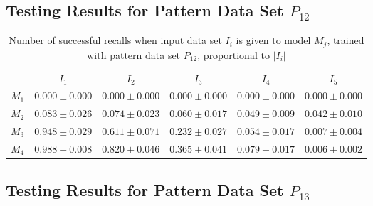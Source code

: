 \documentclass[anon]{CI}
\begin{document}
		\subsection{Testing Results for Pattern Data Set $P_{12}$}
		
		
		\begin{table}[H]
			\centering
			\def\arraystretch{1.5}
			\footnotesize
			\begin{tabular}{cccccc}
				
				& $I_{1}$  & $I_{2}$  & $I_{3}$  & $I_{4}$  & $I_{5}$ \\ \cline{2-6}
				$M_{1}$  & $0.000\pm0.000$  & $0.000\pm0.000$  & $0.000\pm0.000$  & $0.000\pm0.000$  & $0.000\pm0.000$ \\
				$M_{2}$  & $0.083\pm0.026$  & $0.074\pm0.023$  & $0.060\pm0.017$  & $0.049\pm0.009$  & $0.042\pm0.010$ \\
				$M_{3}$  & $0.948\pm0.029$  & $0.611\pm0.071$  & $0.232\pm0.027$  & $0.054\pm0.017$  & $0.007\pm0.004$ \\
				$M_{4}$  & $0.988\pm0.008$  & $0.820\pm0.046$  & $0.365\pm0.041$  & $0.079\pm0.017$  & $0.006\pm0.002$ \\
				
			\end{tabular}
			\caption{Number of successful recalls when input data set $I_i$ is given to model $M_j$, trained with pattern data set $P_{12}$, proportional to $\left|I_i\right|$}
		\end{table}
		
		\subsection{Testing Results for Pattern Data Set $P_{13}$}
		
		
\end{document}
